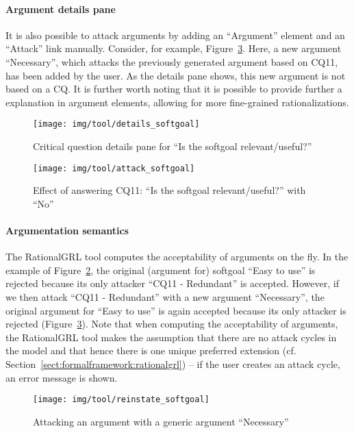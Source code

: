 \paragraph{Argument details pane} It is also possible to attack arguments by adding an ``Argument'' element and an ``Attack'' link manually. Consider, for example, Figure~\ref{fig:tool:argument}. Here, a new argument ``Necessary'', which attacks the previously generated argument based on CQ11, has been added by the user. As the details pane shows, this new argument is not based on a CQ. It is further worth noting that it is possible to provide further a explanation in argument elements, allowing for more fine-grained rationalizations. 

\begin{figure}[t]
\centering
\texttt{[image: img/tool/details\_softgoal]}
\caption{Critical question details pane for ``Is the softgoal relevant/useful?''}
\label{fig:tool:cqdetails}
\end{figure}

\begin{figure}[b]
\centering
\texttt{[image: img/tool/attack\_softgoal]}
\caption{Effect of answering CQ11: ``Is the softgoal relevant/useful?'' with ``No''}
\label{fig:tool:cqeffect}
\end{figure}

\paragraph{Argumentation semantics} The RationalGRL tool computes the acceptability of arguments on the fly. In the example of Figure~\ref{fig:tool:cqeffect}, the original (argument for) softgoal ``Easy to use'' is rejected because its only attacker ``CQ11 - Redundant'' is accepted. However, if we then attack ``CQ11 - Redundant'' with a new argument ``Necessary'', the original argument for ``Easy to use'' is again accepted because its only attacker is rejected  (Figure~\ref{fig:tool:argument}). Note that when computing the acceptability of arguments, the RationalGRL tool makes the assumption that there are no attack cycles in the model and that hence there is one unique preferred extension (cf. Section~\ref{sect:formalframework:rationalgrl}) -- if the user creates an attack cycle, an error message is shown. 

\begin{figure}[t]
\centering
\texttt{[image: img/tool/reinstate\_softgoal]}
\caption{Attacking an argument with a generic argument ``Necessary''}
\label{fig:tool:argument}
\end{figure}

